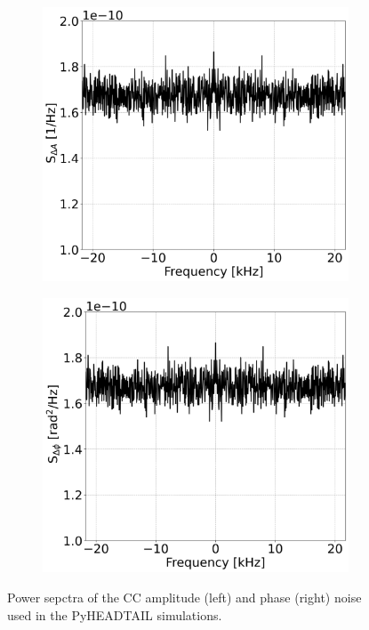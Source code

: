 \begin{figure}[htp]
    \centering
    \begin{subfigure}{.45\textwidth}
        \centering
        \includegraphics[width=.95\linewidth]{images/Ch6/psd_amplitude_noise_example.png}  
    \end{subfigure}
    \begin{subfigure}{.45\textwidth}
        \centering
        \includegraphics[width=.95\linewidth]{images/Ch6/psd_phase_noise_example.png}
    \end{subfigure}
    \caption{Power sepctra of the CC amplitude (left) and phase (right) noise used in the PyHEADTAIL simulations.}
    \label{fig:psd_cc_simulations_example}
\end{figure}

